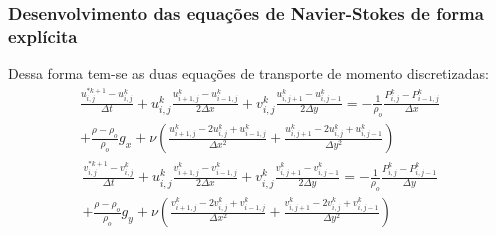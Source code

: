\documentclass[xcolor=dvipsnames,10pt,aspectratio=169]{beamer}
\begin{document}
	\begin{frame}
		\frametitle{Desenvolvimento das equações de Navier-Stokes  de forma explícita}
		Dessa forma tem-se as duas equações de transporte de momento discretizadas:
		\begin{equation}
			\begin{split}
			\frac{u_{i , j}^{\ast k + 1} - u_{i , j}^{k}}{\Delta t} + u_{i , j}^{k}\frac{u_{i + 1 , j}^k - u_{i - 1 , j}^k  }{2 \Delta x} + v_{i , j}^{k}\frac{u_{i , j+ 1}^k - u_{i, j-1}^k  }{2 \Delta y} =  -\frac{1}{\rho_o} \frac{P_{i, j}^k - P_{i - 1 , j}^k}{\Delta x} \\ + \frac{\rho - 	\rho_o}{\rho_o} g_x + \nu \left( \frac{u_{i+1 , j}^{k} - 2 u_{i,j}^{k} + u_{i-1,j}^{k}}{\Delta x^2} + \frac{u_{i , j+1}^{k} - 2 u_{i,j}^{k} + u_{i,j-1}^{k}}{\Delta y^2} \right)
			\end{split}
		\end{equation}
		\begin{equation}
			\begin{split}
			\frac{v_{i , j}^{\ast k + 1} - v_{i , j}^{k}}{\Delta t} + u_{i , j}^{k}\frac{v_{i + 1 , j}^k - v_{i - 1 , j}^k  }{2 \Delta x} + v_{i , j}^{k}\frac{v_{i , j+ 1}^k - v_{i, j-1}^k  }{2 \Delta y} =  -\frac{1}{\rho_o} \frac{P_{i , j}^k - P_{i , j - 1}^k}{\Delta y} \\ + \frac{\rho - \rho_o}{\rho_o} g_y + \nu \left( \frac{v_{i+1 , j}^{k} - 2 v_{i,j}^{k} + v_{i-1,j}^{k}}{\Delta x^2} + \frac{v_{i , j+1}^{k} - 2 v_{i,j}^{k} + v_{i,j-1}^{k}}{\Delta y^2} \right)
			\end{split}
		\end{equation}
	\end{frame}
\end{document}
